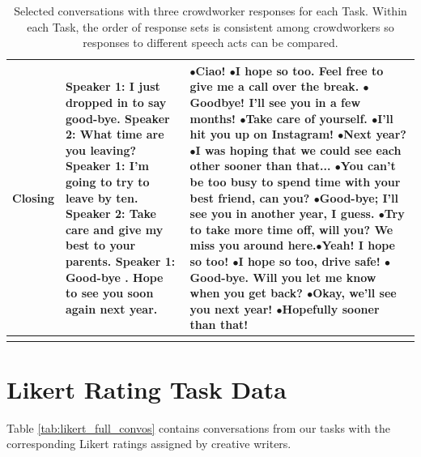 \documentclass[11pt]{article}
\begin{document}
\begin{longtable}{|p{2cm}|p{3cm}|p{10cm}|}
 Closing & \textbf{Speaker 1:} I just dropped in to say good-bye. \newline \hspace*{0.5cm} \textbf{Speaker 2:} What time are you leaving? \newline \textbf{Speaker 1:} I'm going to try to leave by ten. \newline \hspace*{0.5cm} \textbf{Speaker 2:} Take care and give my best to your parents. \newline \textbf{Speaker 1:} Good-bye . Hope to see you soon again next year. & $\bullet$Ciao! \newline $\bullet$I hope so too. Feel free to give me a call over the break. \newline $\bullet$Goodbye! I'll see you in a few months! \newline $\bullet$Take care of yourself. \newline $\bullet$I'll hit you up on Instagram!	\newline \newline $\bullet$Next year? \newline $\bullet$I was hoping that we could see each other sooner than that... \newline $\bullet$You can't be too busy to spend time with your best friend, can you? \newline $\bullet$Good-bye; I'll see you in another year, I guess. \newline $\bullet$Try to take more time off, will you? We miss you around here.\newline \newline $\bullet$Yeah! I hope so too! \newline $\bullet$I hope so too, drive safe! \newline $\bullet$Good-bye. Will you let me know when you get back? \newline $\bullet$Okay, we'll see you next year! \newline $\bullet$Hopefully sooner than that! \\\hline
  \caption{Selected conversations with three crowdworker responses for each Task.  Within each Task, the order of response sets is consistent among crowdworkers so responses to different speech acts can be compared.}
 \label{tab:writing_task_data}
 \end{longtable}
\clearpage
\normalsize
\twocolumn
\section{Likert Rating Task Data}\label{app:likert}
Table \ref{tab:likert_full_convos} contains conversations from our tasks with the corresponding Likert ratings assigned by creative writers.
\end{document}
